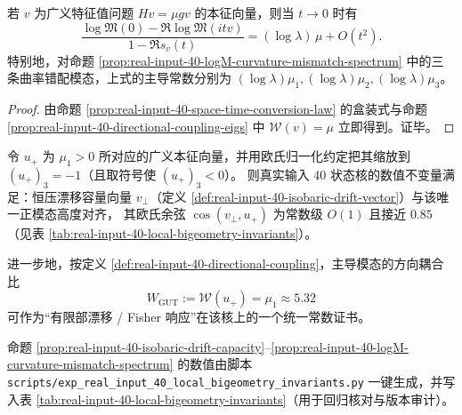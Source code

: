 \begin{corollary}\label{cor:real-input-40-space-time-conversion-eigmodes}
若 \(v\) 为广义特征值问题 \(Hv=\mu gv\) 的本征向量，则当 \(t\to 0\) 时有
\[
\frac{\log\mathfrak{M}(0)-\Re\log\mathfrak{M}(itv)}{1-\Re s_v(t)}
=(\log\lambda)\,\mu+O(t^2).
\]
特别地，对命题 \ref{prop:real-input-40-logM-curvature-mismatch-spectrum} 中的三条曲率错配模态，上式的主导常数分别为 \((\log\lambda)\mu_1,(\log\lambda)\mu_2,(\log\lambda)\mu_3\)。
\end{corollary}
\begin{proof}
由命题 \ref{prop:real-input-40-space-time-conversion-law} 的盒装式与命题 \ref{prop:real-input-40-directional-coupling-eigs} 中 \(\mathcal{W}(v)=\mu\) 立即得到。证毕。
\end{proof}

\begin{proposition}\label{prop:real-input-40-unified-generator-alignment}
令 \(u_+\) 为 \(\mu_1>0\) 所对应的广义本征向量，并用欧氏归一化约定把其缩放到 \((u_+)_3=-1\)（且取符号使 \((u_+)_3<0\)）。
则真实输入 40 状态核的数值不变量满足：恒压漂移容量向量 \(v_\perp\)（定义 \ref{def:real-input-40-isobaric-drift-vector}）与该唯一正模态高度对齐，
其欧氏余弦 \(\cos(v_\perp,u_+)\) 为常数级 \(O(1)\) 且接近 \(0.85\)（见表 \ref{tab:real-input-40-local-bigeometry-invariants}）。
\par
进一步地，按定义 \ref{def:real-input-40-directional-coupling}，主导模态的方向耦合比
\[
W_{\mathrm{GUT}}:=\mathcal{W}(u_+)=\mu_1\approx 5.32
\]
可作为“有限部漂移 / Fisher 响应”在该核上的一个统一常数证书。
\end{proposition}

\begin{remark}\label{rem:real-input-40-local-bigeometry-script}
命题 \ref{prop:real-input-40-isobaric-drift-capacity}--\ref{prop:real-input-40-logM-curvature-mismatch-spectrum} 的数值由脚本 \texttt{scripts/exp\_real\_input\_40\_local\_bigeometry\_invariants.py} 一键生成，并写入表 \ref{tab:real-input-40-local-bigeometry-invariants}（用于回归核对与版本审计）。
\end{remark}


